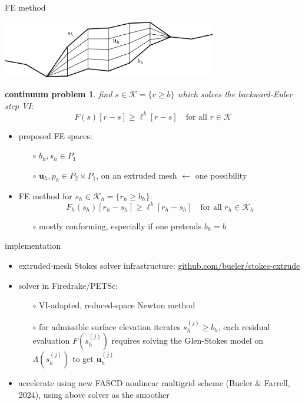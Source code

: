\documentclass[10pt,dvipsnames]{beamer}
\newtheorem*{cproblem}{continuum problem}
\newcommand{\bu}{\mathbf{u}}
\newcommand{\cK}{\mathcal{K}}
\begin{document}
\begin{frame}{FE method}

\begin{center}
\includegraphics[width=0.7\textwidth]{extruded}
\end{center}

\begin{cproblem}
find $s\in\cK = \{r \ge b\}$ which solves the backward-Euler step VI:
   $$F(s)[r-s] \ge \ell^k[r-s] \quad \text{for all } r \in \cK$$
\end{cproblem}

\begin{itemize}
\item proposed FE spaces:
   \begin{itemize}
   \item[$\circ$] $b_h,s_h \in P_1$
   \item[$\circ$] $\bu_h,p_h \in P_2 \times P_1$, on an extruded mesh \hfill {\scriptsize $\leftarrow$ one possibility}
   \end{itemize}
\item FE method for $s_h\in\cK_h = \{r_h \ge b_h\}$:
   $$F_h(s_h)[r_h-s_h] \ge \ell^k[r_h-s_h] \quad \text{for all } r_h \in \cK_h$$

   \begin{itemize}
   \item[$\circ$] mostly conforming, especially if one pretends $b_h=b$
   \end{itemize}
\end{itemize}

\phantom{x}
\end{frame}


\begin{frame}{implementation }

\begin{itemize}
\item extruded-mesh Stokes solver infrastructure: \href{https://github.com/bueler/stokes-extrude}{github.com/bueler/stokes-extrude}
\item solver in Firedrake/PETSc:
    \begin{itemize}
    \item[$\circ$] VI-adapted, reduced-space Newton method
    \item[$\circ$] for admissible surface elevation iterates $s_h^{(j)} \ge b_h$, \alert<2>{each residual evaluation $F(s_h^{(j)})$ requires solving the Glen-Stokes model on $\Lambda(s_h^{(j)})$ to get $\bu_h^{(j)}$}
    \end{itemize}
\item accelerate using new FASCD nonlinear multigrid scheme (Bueler \& Farrell, 2024), using above solver as the smoother
\end{itemize}

\bigskip
\end{frame}
\end{document}
